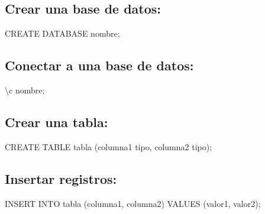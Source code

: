 \documentclass[
  a4paper,
  DIV=11,
  numbers=noendperiod,
  onepage,
  openany]{scrreprt}
\newenvironment{Shaded}{\begin{snugshade}}{\end{snugshade}}
\newcommand{\KeywordTok}[1]{\textcolor[rgb]{0.00,0.23,0.31}{#1}}
\newcommand{\NormalTok}[1]{\textcolor[rgb]{0.00,0.23,0.31}{#1}}
\begin{document}
\hypertarget{crear-una-base-de-datos}{%
\subsection{Crear una base de datos:}\label{crear-una-base-de-datos}}

\begin{Shaded}
\begin{Highlighting}[]
\KeywordTok{CREATE} \KeywordTok{DATABASE}\NormalTok{ nombre;}
\end{Highlighting}
\end{Shaded}

\hypertarget{conectar-a-una-base-de-datos}{%
\subsection{Conectar a una base de
datos:}\label{conectar-a-una-base-de-datos}}

\begin{Shaded}
\begin{Highlighting}[]
\NormalTok{\textbackslash{}c nombre;}
\end{Highlighting}
\end{Shaded}

\hypertarget{crear-una-tabla}{%
\subsection{Crear una tabla:}\label{crear-una-tabla}}

\begin{Shaded}
\begin{Highlighting}[]
\KeywordTok{CREATE} \KeywordTok{TABLE}\NormalTok{ tabla (columna1 tipo, columna2 tipo);}
\end{Highlighting}
\end{Shaded}

\hypertarget{insertar-registros}{%
\subsection{Insertar registros:}\label{insertar-registros}}

\begin{Shaded}
\begin{Highlighting}[]
\KeywordTok{INSERT} \KeywordTok{INTO}\NormalTok{ tabla (columna1, columna2) }\KeywordTok{VALUES}\NormalTok{ (valor1, valor2);}
\end{Highlighting}
\end{Shaded}
\end{document}
